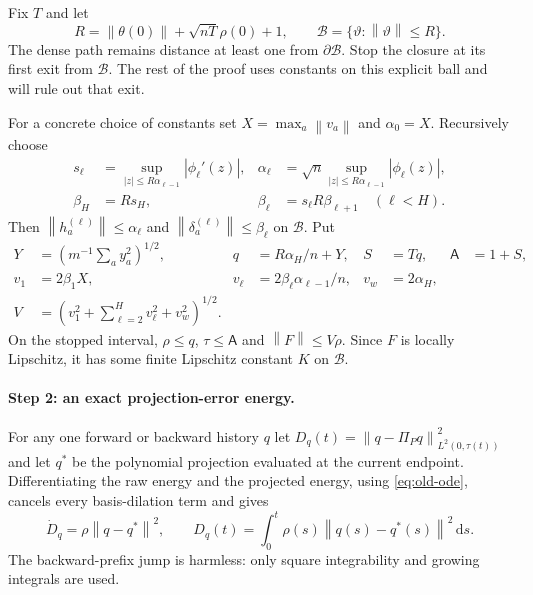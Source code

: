 \documentclass[11pt]{article}
\theoremstyle{definition}
\theoremstyle{remark}
\newcommand{\norm}[1]{\left\lVert #1\right\rVert}
\newcommand{\dd}{\,\mathrm{d}}
\begin{document}
Fix $T$ and let
\[
 R=\norm{\theta(0)}+\sqrt{nT}\rho(0)+1,
 \qquad \mathcal B=\{\vartheta:\norm{\vartheta}\le R\}.
\]
The dense path remains distance at least one from $\partial\mathcal B$.  Stop
the closure at its first exit from $\mathcal B$.  The rest of the proof uses
constants on this explicit ball and will rule out that exit.

For a concrete choice of constants set $X=\max_a\norm{v_a}$ and
$\alpha_0=X$.  Recursively choose
\begin{align}
 s_\ell&=\sup_{|z|\le R\alpha_{\ell-1}}|\phi_\ell'(z)|,&
 \alpha_\ell&=\sqrt n\sup_{|z|\le R\alpha_{\ell-1}}|\phi_\ell(z)|,\nonumber\\
 \beta_H&=R s_H,& \beta_\ell&=s_\ell R\beta_{\ell+1}\quad(\ell<H).
                                                               \label{eq:response-bounds}
\end{align}
Then $\norm{h_a^{(\ell)}}\le\alpha_\ell$ and
$\norm{\delta_a^{(\ell)}}\le\beta_\ell$ on $\mathcal B$.  Put
\begin{align}
 Y&=\left(m^{-1}\sum_a y_a^2\right)^{1/2},&
 q&=R\alpha_H/n+Y,& S&=Tq,& \mathsf A&=1+S,\nonumber\\
 v_1&=2\beta_1X,&
 v_\ell&=2\beta_\ell\alpha_{\ell-1}/n,& v_w&=2\alpha_H,\nonumber\\
 V&=\left(v_1^2+\sum_{\ell=2}^Hv_\ell^2+v_w^2\right)^{1/2}. \label{eq:compact-constants}
\end{align}
On the stopped interval, $\rho\le q$, $\tau\le\mathsf A$ and
$\norm{F}\le V\rho$.  Since $F$ is locally Lipschitz, it has some finite
Lipschitz constant $K$ on $\mathcal B$.

\paragraph{Step 2: an exact projection-error energy.}
For any one forward or backward history $q$ let
$D_q(t)=\norm{q-\Pi_Pq}_{L^2(0,\tau(t))}^2$ and let $q^*$ be the polynomial
projection evaluated at the current endpoint.  Differentiating the raw energy
and the projected energy, using \eqref{eq:old-ode}, cancels every basis-dilation
term and gives
\begin{equation}
 \dot D_q=\rho\norm{q-q^*}^2,
 \qquad D_q(t)=\int_0^t\rho(s)\norm{q(s)-q^*(s)}^2\dd s. \label{eq:projection-energy}
\end{equation}
The backward-prefix jump is harmless: only square integrability and growing
integrals are used.
\end{document}
